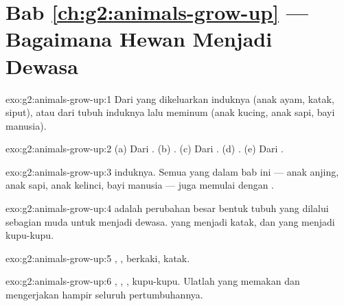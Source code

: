 \section*{Bab \ref{ch:g2:animals-grow-up} --- Bagaimana Hewan Menjadi Dewasa}

\begin{solution}{exo:g2:animals-grow-up:1}
Dari  yang dikeluarkan induknya (anak ayam, katak, siput), atau
 dari tubuh induknya lalu meminum  (anak kucing,
anak sapi, bayi manusia).
\end{solution}

\begin{solution}{exo:g2:animals-grow-up:2}
(a) Dari . (b) . (c) Dari . (d) .
(e) Dari .
\end{solution}

\begin{solution}{exo:g2:animals-grow-up:3}
 induknya. Semua  yang  dalam bab ini --- anak
anjing, anak sapi, anak kelinci, bayi manusia --- juga memulai dengan
.
\end{solution}

\begin{solution}{exo:g2:animals-grow-up:4}
 adalah perubahan besar bentuk tubuh yang dilalui sebagian
 muda untuk menjadi dewasa.  yang menjadi katak, dan 
yang menjadi kupu-kupu.
\end{solution}

\begin{solution}{exo:g2:animals-grow-up:5}
, ,  berkaki, katak.
\end{solution}

\begin{solution}{exo:g2:animals-grow-up:6}
, , , kupu-kupu. Ulatlah yang memakan  dan
mengerjakan hampir seluruh pertumbuhannya.
\end{solution}


